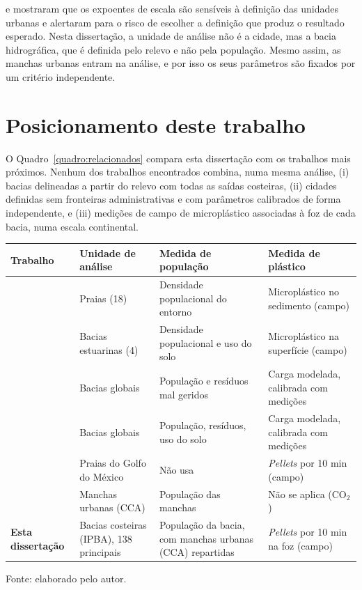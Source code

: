  e  mostraram que os expoentes de escala são sensíveis à definição das unidades urbanas e alertaram para o risco de escolher a definição que produz o resultado esperado. Nesta dissertação, a unidade de análise não é a cidade, mas a bacia hidrográfica, que é definida pelo relevo e não pela população. Mesmo assim, as manchas urbanas entram na análise, e por isso os seus parâmetros são fixados por um critério independente.

\section{Posicionamento deste trabalho}
\label{sec:rel-posicionamento}

O Quadro~\ref{quadro:relacionados} compara esta dissertação com os trabalhos mais próximos. Nenhum dos trabalhos encontrados combina, numa mesma análise, (i) bacias delineadas a partir do relevo com todas as saídas costeiras, (ii) cidades definidas sem fronteiras administrativas e com parâmetros calibrados de forma independente, e (iii) medições de campo de microplástico associadas à foz de cada bacia, numa escala continental.

\begin{quadro}[ht!]
	\centering
	\caption{\label{quadro:relacionados}Comparação entre este trabalho e os trabalhos relacionados mais próximos}
	\small
	\begin{tabular}{|p{2.6cm}|p{2.6cm}|p{3.2cm}|p{3.4cm}|}
		\hline
		\textbf{Trabalho} & \textbf{Unidade de análise} & \textbf{Medida de população} & \textbf{Medida de plástico} \\
		\hline
		\citeonline{browne2011} & Praias (18) & Densidade populacional do entorno & Microplástico no sedimento (campo) \\
		\hline
		\citeonline{yonkos2014} & Bacias estuarinas (4) & Densidade populacional e uso do solo & Microplástico na superfície (campo) \\
		\hline
		\citeonline{lebreton2017} & Bacias globais & População e resíduos mal geridos & Carga modelada, calibrada com medições \\
		\hline
		\citeonline{meijer2021} & Bacias globais & População, resíduos, uso do solo & Carga modelada, calibrada com medições \\
		\hline
		\citeonline{tunnell2020} & Praias do Golfo do México & Não usa & \textit{Pellets} por 10 min (campo) \\
		\hline
		\citeonline{oliveira2014} & Manchas urbanas (CCA) & População das manchas & Não se aplica (CO$_2$) \\
		\hline
		\textbf{Esta dissertação} & Bacias costeiras (IPBA), 138 principais & População da bacia, com manchas urbanas (CCA) repartidas & \textit{Pellets} por 10 min na foz (campo) \\
		\hline
	\end{tabular}
	\par\medskip
	\footnotesize Fonte: elaborado pelo autor.
\end{quadro}
